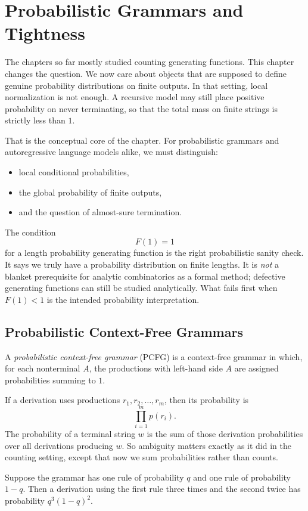 \chapter{Probabilistic Grammars and Tightness}
\label{ch08:top}

The chapters so far mostly studied counting generating functions. This chapter changes the question. We now care about objects that are supposed to define genuine probability distributions on finite outputs. In that setting, local normalization is not enough. A recursive model may still place positive probability on never terminating, so that the total mass on finite strings is strictly less than $1$.

That is the conceptual core of the chapter. For probabilistic grammars and autoregressive language models alike, we must distinguish:
\begin{itemize}
  \item local conditional probabilities,
  \item the global probability of finite outputs,
  \item and the question of almost-sure termination.
\end{itemize}
The condition
\[
  F(1)=1
\]
for a length probability generating function is the right probabilistic sanity check. It says we truly have a probability distribution on finite lengths. It is \emph{not} a blanket prerequisite for analytic combinatorics as a formal method; defective generating functions can still be studied analytically. What fails first when $F(1)<1$ is the intended probability interpretation.

\section{Probabilistic Context-Free Grammars}

A \emph{probabilistic context-free grammar} (PCFG) is a context-free grammar in which, for each nonterminal $A$, the productions with left-hand side $A$ are assigned probabilities summing to $1$.

If a derivation uses productions $r_1,r_2,\dots,r_m$, then its probability is
\[
  \prod_{i=1}^m p(r_i).
\]
The probability of a terminal string $w$ is the sum of those derivation probabilities over all derivations producing $w$. So ambiguity matters exactly as it did in the counting setting, except that now we sum probabilities rather than counts.

\begin{example}
Suppose the grammar has one rule of probability $q$ and one rule of probability $1-q$. Then a derivation using the first rule three times and the second twice has probability $q^3(1-q)^2$.
\end{example}

